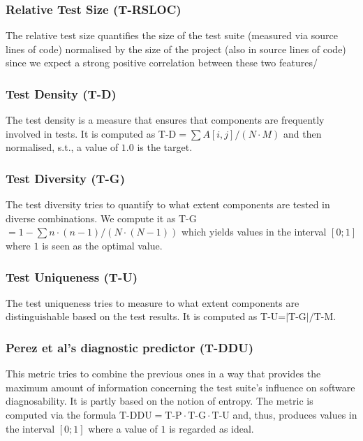 \subsubsection{Relative Test Size (T-RSLOC)}

The relative test size quantifies the size of the test suite (measured via source lines of code) normalised by the size of the project (also in source lines of code) since we expect a strong positive correlation between these two features/

\subsubsection{Test Density (T-D)}

The test density is a measure that ensures that components are frequently
involved in tests. It is computed as T-D$=\sum{A[i,j]}/(N\cdot M)$ and then
normalised, s.t., a value of $1.0$ is the target.

\subsubsection{Test Diversity (T-G)}

The test diversity tries to quantify to what extent components are tested in
diverse combinations. We compute it as T-G$=1 - \sum{n \cdot (n-1)}/ (N \cdot
(N-1))$ which yields values in the interval $[0;1]$ where $1$ is seen as the
optimal value.

\subsubsection{Test Uniqueness (T-U)}

The test uniqueness tries to measure to what extent components are
distinguishable based on the test results. It is computed as T-U=$|\textrm{T-G}|
/ \textrm{T-M}$. 

\subsubsection{Perez et al's diagnostic predictor (T-DDU)}

This metric tries to combine the previous ones in a way that provides the
maximum amount of information concerning the test suite's influence on software
diagnosability. It is partly based on the notion of entropy. The metric is
computed via the formula $\textrm{T-DDU} = \textrm{T-P} \cdot \textrm{T-G} \cdot
\textrm{T-U}$ and, thus, produces values in the interval $[0;1]$ where a value
of $1$ is regarded as ideal.